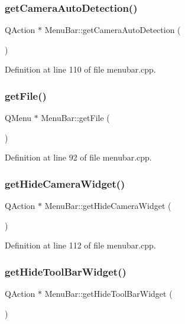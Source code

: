 \subsubsection{\texorpdfstring{getCameraAutoDetection()}{getCameraAutoDetection()}}
{\footnotesize\ttfamily Q\+Action $\ast$ Menu\+Bar\+::get\+Camera\+Auto\+Detection (\begin{DoxyParamCaption}{ }\end{DoxyParamCaption})}



Definition at line 110 of file menubar.\+cpp.

\mbox{\label{class_menu_bar_a7bbea557f2be53d51cf4bdd8d05cf69b}} 
\subsubsection{\texorpdfstring{getFile()}{getFile()}}
{\footnotesize\ttfamily Q\+Menu $\ast$ Menu\+Bar\+::get\+File (\begin{DoxyParamCaption}{ }\end{DoxyParamCaption})}



Definition at line 92 of file menubar.\+cpp.

\mbox{\label{class_menu_bar_aed94bbd0fafcbedc698ea5ad7a52f923}} 
\subsubsection{\texorpdfstring{getHideCameraWidget()}{getHideCameraWidget()}}
{\footnotesize\ttfamily Q\+Action $\ast$ Menu\+Bar\+::get\+Hide\+Camera\+Widget (\begin{DoxyParamCaption}{ }\end{DoxyParamCaption})}



Definition at line 112 of file menubar.\+cpp.

\mbox{\label{class_menu_bar_a141d5a8fe312d3989b1f15ee60cff0d7}} 
\subsubsection{\texorpdfstring{getHideToolBarWidget()}{getHideToolBarWidget()}}
{\footnotesize\ttfamily Q\+Action $\ast$ Menu\+Bar\+::get\+Hide\+Tool\+Bar\+Widget (\begin{DoxyParamCaption}{ }\end{DoxyParamCaption})}



